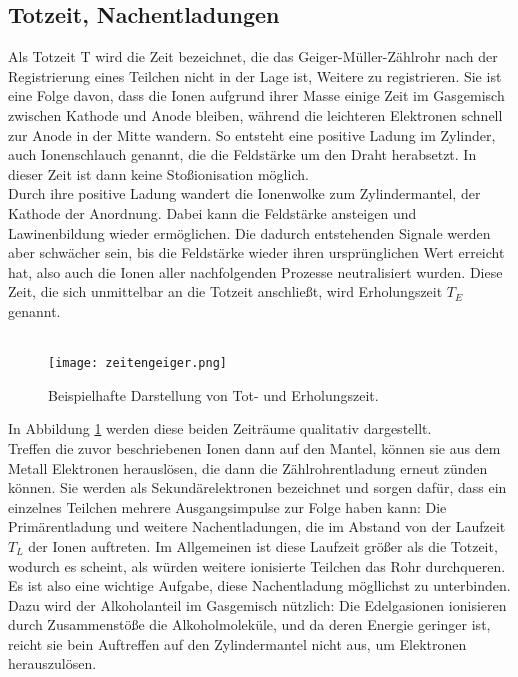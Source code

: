 \subsection{Totzeit, Nachentladungen}
Als Totzeit T wird die Zeit bezeichnet, die das Geiger-Müller-Zählrohr nach
der Registrierung eines Teilchen nicht in der Lage ist, Weitere zu registrieren.
Sie ist eine Folge davon, dass die Ionen aufgrund ihrer Masse einige Zeit im
Gasgemisch zwischen Kathode und Anode bleiben, während die leichteren Elektronen
schnell zur Anode in der Mitte wandern. So entsteht eine positive Ladung im 
Zylinder, auch Ionenschlauch genannt, die die Feldstärke um den Draht herabsetzt.
In dieser Zeit ist dann keine Stoßionisation möglich.\\
Durch ihre positive Ladung wandert die Ionenwolke zum Zylindermantel, der Kathode
der Anordnung. Dabei kann die Feldstärke ansteigen und Lawinenbildung wieder ermöglichen.
Die dadurch entstehenden Signale werden aber schwächer sein, bis die Feldstärke
wieder ihren ursprünglichen Wert erreicht hat, also auch die Ionen aller nachfolgenden
Prozesse neutralisiert wurden. Diese Zeit, die sich unmittelbar an die Totzeit
anschließt, wird Erholungszeit $T_E$ genannt.\\
\\
\begin{figure}
 \centering
 \caption{Beispielhafte Darstellung von Tot- und Erholungszeit.}
 \texttt{[image: zeitengeiger.png]}
 \label{fig:gramm}
\end{figure}
In Abbildung \ref{fig:gramm} werden diese beiden Zeiträume qualitativ dargestellt.\\
Treffen die zuvor beschriebenen Ionen dann auf den Mantel, können sie aus dem
Metall Elektronen herauslösen, die dann die Zählrohrentladung erneut zünden können.
Sie werden als Sekundärelektronen bezeichnet und sorgen dafür, dass ein einzelnes
Teilchen mehrere Ausgangsimpulse zur Folge haben kann: Die Primärentladung und
weitere Nachentladungen, die im Abstand von der Laufzeit $T_L$ der Ionen 
auftreten. Im Allgemeinen ist diese Laufzeit größer als die Totzeit, wodurch es
scheint, als würden weitere ionisierte Teilchen das Rohr durchqueren.\\
Es ist also eine wichtige Aufgabe, diese Nachentladung mögllichst zu unterbinden.
Dazu wird der Alkoholanteil im Gasgemisch nützlich: Die Edelgasionen 
ionisieren durch Zusammenstöße die Alkoholmoleküle, und da deren Energie 
geringer ist, reicht sie bein Auftreffen auf den Zylindermantel nicht aus,
um Elektronen herauszulösen. 

